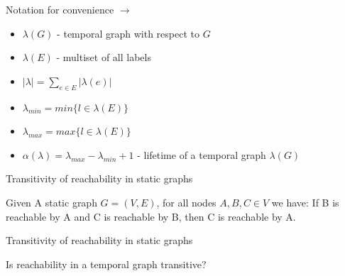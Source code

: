 \documentclass{beamer}
\begin{document}
\begin{frame}{Notation for convenience $\rightarrow$ \cite[p. 243ff]{Michail2015}}
\begin{itemize}
	\item $\lambda(G)$ - temporal graph with respect to $G$
	\item $\lambda(E)$ - multiset of all labels
	\item $| \lambda | = \sum_{e \in E} | \lambda(e) | $
	\item $ \lambda_{min} = min\{l \in \lambda(E)\} $
	\item $ \lambda_{max} = max\{l \in \lambda(E)\} $
	\item $\alpha(\lambda) = \lambda_{max} - \lambda_{min} + 1$ - lifetime of a temporal graph $\lambda(G)$
\end{itemize}
\end{frame}

\begin{frame}{Transitivity of reachability in static graphs}
		\begin{tcolorbox}[title=Reachability in a static graph is transitive]
      Given A static graph $G = (V, E)$, for all nodes $A, B, C \in V$ we have:
      If B is reachable by A and C is reachable by B, then C is reachable by A. \\
      \begin{center}
     \end{center}
		\end{tcolorbox}
\end{frame}

\begin{frame}{Transitivity of reachability in static graphs}
  \begin{center}
    \large
    Is reachability in a temporal graph transitive?
  \end{center}
\end{frame}
\end{document}

